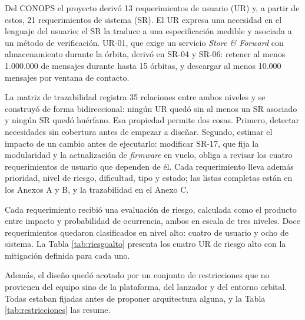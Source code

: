 Del CONOPS el proyecto derivó 13 requerimientos de usuario (UR) y, a partir de estos, 21 requerimientos de sistema (SR). El UR expresa una necesidad en el lenguaje del usuario; el SR la traduce a una especificación medible y asociada a un método de verificación. UR-01, que exige un servicio \textit{Store \& Forward} con almacenamiento durante la órbita, derivó en SR-04 y SR-06: retener al menos 1.000.000 de mensajes durante hasta 15 órbitas, y descargar al menos 10.000 mensajes por ventana de contacto.

La matriz de trazabilidad registra 35 relaciones entre ambos niveles y se construyó de forma bidireccional: ningún UR quedó sin al menos un SR asociado y ningún SR quedó huérfano. Esa propiedad permite dos cosas. Primero, detectar necesidades sin cobertura antes de empezar a diseñar. Segundo, estimar el impacto de un cambio antes de ejecutarlo: modificar SR-17, que fija la modularidad y la actualización de \textit{firmware} en vuelo, obliga a revisar los cuatro requerimientos de usuario que dependen de él. Cada requerimiento lleva además prioridad, nivel de riesgo, dificultad, tipo y estado; las listas completas están en los Anexos A y B, y la trazabilidad en el Anexo C.

Cada requerimiento recibió una evaluación de riesgo, calculada como el producto entre impacto y probabilidad de ocurrencia, ambos en escala de tres niveles. Doce requerimientos quedaron clasificados en nivel alto: cuatro de usuario y ocho de sistema. La Tabla \ref{tab:riesgoalto} presenta los cuatro UR de riesgo alto con la mitigación definida para cada uno.

Además, el diseño quedó acotado por un conjunto de restricciones que no provienen del equipo sino de la plataforma, del lanzador y del entorno orbital. Todas estaban fijadas antes de proponer arquitectura alguna, y la Tabla \ref{tab:restricciones} las resume.

